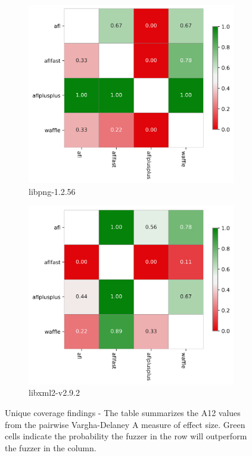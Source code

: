 \begin{figure}
    \begin{subfigure}[b]{0.475\linewidth}
        \centering
        \includegraphics[width=0.95\linewidth]{Experiments/libpng-1.2.56_varga_delaney_a12_plot.png}
        \caption{libpng-1.2.56}
        \label{fig:sub:libpng-vda12}
    \end{subfigure}
    \begin{subfigure}[b]{0.475\linewidth}
        \centering
        \includegraphics[width=0.95\linewidth]{Experiments/libxml2-v2.9.2_varga_delaney_a12_plot.png}
        \caption{libxml2-v2.9.2}
        \label{fig:sub:libxml-vda12}
    \end{subfigure}

    \caption{Unique coverage findings - The table summarizes the A12 values from the pairwise Vargha-Delaney A measure of effect size. Green cells indicate the probability the fuzzer in the row will outperform the fuzzer in the column.}
    \label{fig:vda12}
\end{figure}


